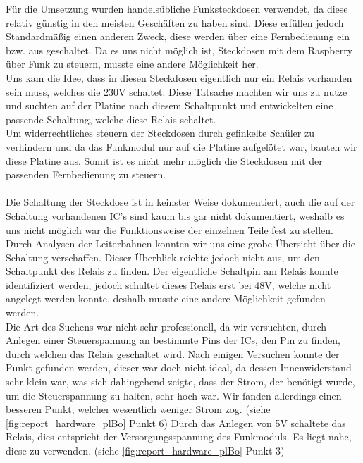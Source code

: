 Für die Umsetzung wurden handelsübliche Funksteckdosen verwendet, da diese relativ günstig in den meisten Geschäften zu haben sind. Diese erfüllen jedoch Standardmäßig einen anderen Zweck, diese werden über eine Fernbedienung ein bzw. aus geschaltet. Da es uns nicht möglich ist, Steckdosen mit dem Raspberry über Funk zu steuern, musste eine andere Möglichkeit her.\\
Uns kam die Idee, dass in diesen Steckdosen eigentlich nur ein Relais vorhanden sein muss, welches die 230V schaltet. Diese Tatsache machten wir uns zu nutze und suchten auf der Platine nach diesem Schaltpunkt und entwickelten eine passende Schaltung, welche diese Relais schaltet.\\
Um widerrechtliches steuern der Steckdosen durch gefinkelte Schüler zu verhindern und da das Funkmodul nur auf die Platine aufgelötet war, bauten wir diese Platine aus. Somit ist es nicht mehr möglich die Steckdosen mit der passenden Fernbedienung zu steuern.\\\\
Die Schaltung der Steckdose ist in keinster Weise dokumentiert, auch die auf der Schaltung vorhandenen IC's sind kaum bis gar nicht dokumentiert, weshalb es uns nicht möglich war die Funktionsweise der einzelnen Teile fest zu stellen. Durch Analysen der Leiterbahnen konnten wir uns eine grobe Übersicht über die Schaltung verschaffen. Dieser Überblick reichte jedoch nicht aus, um den Schaltpunkt des Relais zu finden. Der eigentliche Schaltpin am Relais konnte identifiziert werden, jedoch schaltet dieses Relais erst bei 48V, welche nicht angelegt werden konnte, deshalb musste eine andere Möglichkeit gefunden werden.\\ 
Die Art des Suchens war nicht sehr professionell, da wir versuchten, durch Anlegen einer Steuerspannung an bestimmte Pins der ICs, den Pin zu finden, durch welchen das Relais geschaltet wird. Nach einigen Versuchen konnte der Punkt gefunden werden, dieser war doch nicht ideal, da dessen Innenwiderstand sehr klein war, was sich dahingehend zeigte, dass der Strom, der benötigt wurde, um die Steuerspannung zu halten, sehr hoch war. Wir fanden allerdings einen besseren Punkt, welcher wesentlich weniger Strom zog. (siehe \autoref{fig:report_hardware_plBo} Punkt 6) Durch das Anlegen von 5V schaltete das Relais, dies entspricht der Versorgungsspannung des Funkmoduls. Es liegt nahe, diese zu verwenden. (siehe \autoref{fig:report_hardware_plBo} Punkt 3)\\
